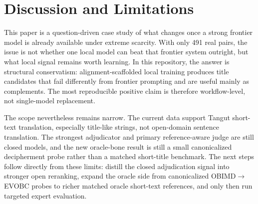 \section{Discussion and Limitations}

This paper is a question-driven case study of what changes once a strong frontier model is already available under extreme scarcity. With only 491 real pairs, the issue is not whether one local model can beat that frontier system outright, but what local signal remains worth learning. In this repository, the answer is structural conservatism: alignment-scaffolded local training produces title candidates that fail differently from frontier prompting and are useful mainly as complements. The most reproducible positive claim is therefore workflow-level, not single-model replacement.

The scope nevertheless remains narrow. The current data support Tangut short-text translation, especially title-like strings, not open-domain sentence translation. The strongest adjudicator and primary reference-aware judge are still closed models, and the new oracle-bone result is still a small canonicalized decipherment probe rather than a matched short-title benchmark. The next steps follow directly from these limits: distill the closed adjudication signal into stronger open reranking, expand the oracle side from canonicalized OBIMD$\rightarrow$EVOBC probes to richer matched oracle short-text references, and only then run targeted expert evaluation.
